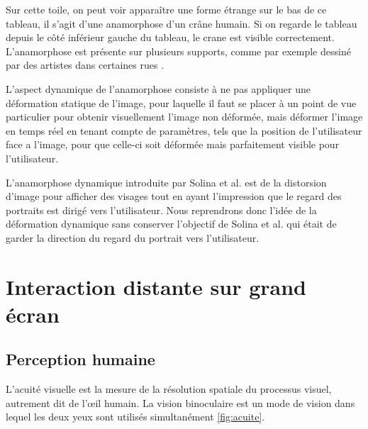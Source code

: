 Sur cette toile, on peut voir apparaître une forme étrange sur le bas de ce tableau, il s'agit d'une anamorphose d'un crâne humain. Si on regarde le tableau depuis le côté inférieur gauche du tableau, le crane est visible correctement. L'anamorphose est présente sur plusieurs supports, comme par exemple dessiné par des artistes dans certaines rues \cite{pavementArt}.

L’aspect dynamique de l’anamorphose consiste à ne pas appliquer une déformation statique de l’image, pour laquelle il faut se placer à un point de vue particulier pour obtenir visuellement l'image non déformée, mais déformer l’image en temps réel en tenant compte de paramètres, tels que la position de l’utilisateur face a l’image, pour que celle-ci soit déformée mais parfaitement visible pour l'utilisateur. 

L'anamorphose dynamique introduite par Solina et al. est de la distorsion d'image pour afficher des visages tout en ayant l'impression que le regard des portraits est dirigé vers l'utilisateur. Nous reprendrons donc l'idée de la déformation dynamique sans conserver l'objectif de Solina et al. qui était de garder la direction du regard du portrait vers l'utilisateur.










\section{Interaction distante sur grand écran}
\subsection{Perception humaine}

L'acuité visuelle est la mesure de la résolution spatiale du processus visuel, autrement dit de l'œil humain. La vision binoculaire est un mode de vision dans lequel les deux yeux sont utilisés simultanément \ref{fig:acuite}. 

